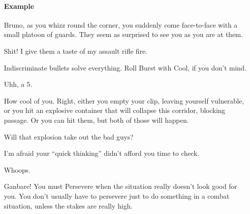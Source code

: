 \paragraph{Example}
\begin{dialogue}
   Bruno, as you whizz round the corner, you suddenly come
  face-to-face with a small platoon of guards. They seem as surprised
  to see you as you are at them.

   Shit! I give them a taste of my assault rifle fire.

   Indiscriminate bullets solve everything. Roll Burst with
  Cool, if you don't mind.

   Uhh, a 5.

   How cool of you. Right, either you empty your clip,
  leaving yourself vulnerable, or you hit an explosive container that
  will collapse this corridor, blocking passage. Or you can hit them,
  but both of those will happen.

   Will that explosion take out the bad guys?

   I'm afraid your ``quick thinking'' didn't afford you time to check.

   Whoops.
\end{dialogue}







Ganbare! You must Persevere when the situation really doesn't look good for you. You don't usually have to persevere just to do something in a combat situation, unless the stakes are really high.

